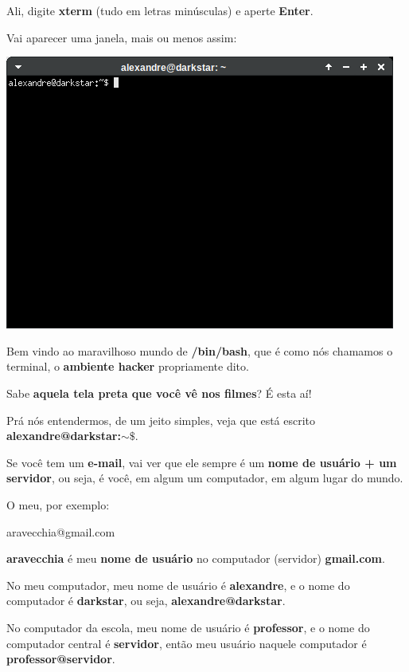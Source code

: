 \begin{multicols}{2}
Ali, digite \textbf{xterm} (tudo em letras minúsculas) e aperte \textbf{Enter}.

Vai aparecer uma janela, mais ou menos assim:


\begin{center}
	\includegraphics[width=\linewidth]{./IMG-GIT/Screenshot_20231222_143805.png}
\end{center}

	Bem vindo ao maravilhoso mundo de \textbf{/bin/bash}, que é como nós chamamos o terminal, o \textbf{ambiente hacker} propriamente dito.
	
	Sabe \textbf{aquela tela preta que você vê nos filmes}? É esta aí!
	
	Prá nós entendermos, de um jeito simples, veja que está escrito \textbf{alexandre@darkstar:$\sim\$$}.
	
	Se você tem um \textbf{e-mail}, vai ver que ele sempre é um \textbf{nome de usuário + um servidor}, ou seja, é você, em algum um computador, em algum lugar do mundo.
	
	O meu, por exemplo:
	
	\begin{center}
		{\large aravecchia@gmail.com}
	\end{center}

\textbf{aravecchia} é meu \textbf{nome de usuário} no computador (servidor) \textbf{gmail.com}.

No meu computador, meu nome de usuário é \textbf{alexandre}, e o nome do computador é \textbf{darkstar}, ou seja, \textbf{alexandre@darkstar}.

No computador da escola, meu nome de usuário é \textbf{professor}, e o nome do computador central é \textbf{servidor}, então meu usuário naquele computador é \textbf{professor@servidor}.


\end{multicols}
